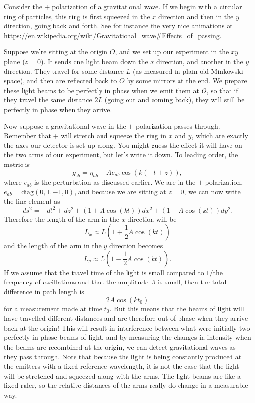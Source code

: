 Consider the $+$ polarization of a gravitational wave. If we begin with a circular ring of particles, this ring is first squeezed in the $x$ direction and then in the $y$ direction, going back and forth. See for instance the very nice animations at \url{https://en.wikipedia.org/wiki/Gravitational_wave#Effects_of_passing}.

Suppose we're sitting at the origin $O$, and we set up our experiment in the $xy$ plane ($z=0$). It sends one light beam down the $x$ direction, and another in the $y$ direction. They travel for some distance $L$ (as measured in plain old Minkowski space), and then are reflected back to $O$ by some mirrors at the end. We prepare these light beams to be perfectly in phase when we emit them at $O$, so that if they travel the same distance $2L$ (going out and coming back), they will still be perfectly in phase when they arrive.

Now suppose a gravitational wave in the $+$ polarization passes through. Remember that $+$ will stretch and squeeze the ring in $x$ and $y$, which are exactly the axes our detector is set up along. You might guess the effect it will have on the two arms of our experiment, but let's write it down. To leading order, the metric is
\begin{equation}
    g_{ab}=\eta_{ab}+A e_{ab}\cos(k(-t+z)),
\end{equation}
where $e_{ab}$ is the perturbation as discussed earlier.
We are in the $+$ polarization, $e_{ab}=\text{diag}(0,1,-1,0)$, and because we are sitting at $z=0$, we can now write the line element as
\begin{equation}
    ds^2=-dt^2+dz^2+(1+A\cos(kt))dx^2 + (1-A\cos(k t))dy^2.
\end{equation}
Therefore the length of the arm in the $x$ direction will be
$$L_x\approx L\left(1+\frac{1}{2}A\cos(kt)\right)$$
and the length of the arm in the $y$ direction becomes
$$L_y\approx L\left(1-\frac{1}{2}A\cos(k t)\right).$$
If we assume that the travel time of the light is small compared to $1/$the frequency of oscillations and that the amplitude $A$ is small, then the total difference in path length is
$$2A\cos(kt_0)$$
for a measurement made at time $t_0$. But this means that the beams of light will have travelled different distances and are therefore out of phase when they arrive back at the origin! This will result in interference between what were initially two perfectly in phase beams of light, and by measuring the changes in intensity when the beams are recombined at the origin, we can detect gravitational waves as they pass through. Note that because the light is being constantly produced at the emitters with a fixed reference wavelength, it is not the case that the light will be stretched and squeezed along with the arms. The light beams are like a fixed ruler, so the relative distances of the arms really do change in a measurable way.

